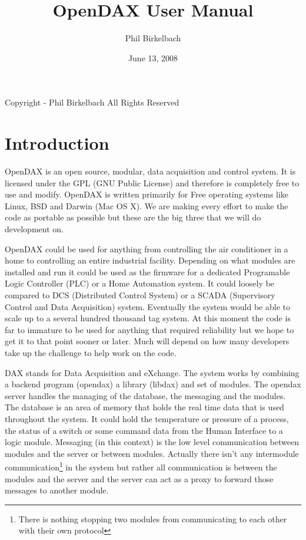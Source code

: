 \documentclass[letterpaper,10pt]{report}
\title{OpenDAX User Manual}
\date{June 13, 2008}
\author{Phil Birkelbach}
\begin{document}
\begin{titlepage}
\maketitle

\begin{flushleft}
Copyright  - Phil Birkelbach\linebreak
All Rights Reserved
\end{flushleft}

\end{titlepage}
\chapter*{Introduction}
OpenDAX is an open source, modular, data acquisition and control system. It is licensed under the GPL (GNU Public License) and therefore is completely free to use and modify. OpenDAX is written primarily for Free operating systems like Linux, BSD and Darwin (Mac OS X). We are making every effort to make the code as portable as possible but these are the big three that we will do development on.

OpenDAX could be used for anything from controlling the air conditioner in a home to controlling an entire industrial facility. Depending on what modules are installed and run it could be used as the firmware for a dedicated Programable Logic Controller (PLC) or a Home Automation system. It could loosely be compared to DCS (Distributed Control System) or a SCADA (Supervisory Control and Data Acquisition) system. Eventually the system would be able to scale up to a several hundred thousand tag system. At this moment the code is far to immature to be used for anything that required reliability but we hope to get it to that point sooner or later. Much will depend on how many developers take up the challenge to help work on the code.

DAX stands for Data Acquisition and eXchange. The system works by combining a backend program (opendax) a library (libdax) and set of modules. The opendax server handles the managing of the database, the messaging and the modules.  The database is an area of memory that holds the real time data that is used throughout the system.  It could hold the temperature or pressure of a process, the status of a switch or some command data from the Human Interface to a logic module.  Messaging (in this context) is the low level communication between modules and the server or between modules.  Actually there isn't any intermodule communication\footnote{There is nothing stopping two modules from communicating to each other with their own protocol} in the system but rather all communication is between the modules and the server and the server can act as a proxy to forward those messages to another module.
\end{document}
